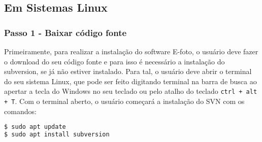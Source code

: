 \subsection{Em Sistemas Linux}

\subsubsection{Passo 1 - Baixar código fonte}
Primeiramente, para realizar a instalação do software E-foto, o usuário deve fazer o download do seu código fonte e para isso é necessário a instalação do subversion, se já não estiver instalado. Para tal, o usuário deve abrir o terminal do seu sistema Linux, que pode ser feito digitando terminal na barra de busca ao apertar a tecla do Windows no seu teclado ou pelo atalho do teclado \texttt{ctrl + alt + T}. Com o terminal aberto, o usuário começará a instalação do SVN com os comandos: 
\begin{lstlisting}[language=bash]
$ sudo apt update
$ sudo apt install subversion
\end{lstlisting}
 
